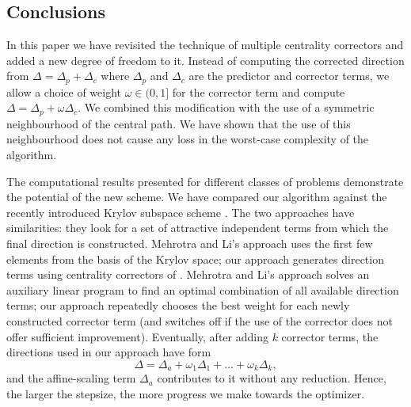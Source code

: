 % 
%

%
%
\subsection{Conclusions}
\label{Conclusions}

In this paper we have revisited the technique of multiple centrality 
correctors \cite{Gondzio96} and added a new degree of freedom to it. 
Instead of computing the corrected direction from 
$\Delta = \Delta_p + \Delta_c$ where $\Delta_p$ and $\Delta_c$ are 
the predictor and corrector terms, we allow a choice of weight 
$\omega \in (0,1]$ for the corrector term and compute 
$\Delta = \Delta_p + \omega \Delta_c$.
We combined this modification with the use of a symmetric neighbourhood
of the central path. We have shown that the use of this neighbourhood
does not cause any loss in the worst-case complexity of the algorithm. 

The computational results presented for different classes of problems 
demonstrate the potential of the new scheme. We have compared our algorithm 
against the recently introduced Krylov subspace scheme \cite{MehrotraLi}.
The two approaches have similarities: they look for a set of attractive 
independent terms from which the final direction is constructed. 
Mehrotra and Li's approach uses the first few elements from the basis
of the Krylov space; our approach generates direction terms using 
centrality correctors of \cite{Gondzio96}. Mehrotra and Li's approach 
solves an auxiliary linear program to find an optimal combination 
of all available direction terms; our approach repeatedly chooses 
the best weight for each newly constructed corrector term (and switches 
off if the use of the corrector does not offer sufficient improvement). 
Eventually, after adding $k$ corrector terms, 
the directions used in our approach have form
\[
\Delta = \Delta_a + \omega_1\Delta_1 + \ldots + \omega_k\Delta_k,
\]
and the affine-scaling term $\Delta_a$ contributes to it without any
reduction. Hence, the larger the stepsize, the more progress we make
towards the optimizer.

